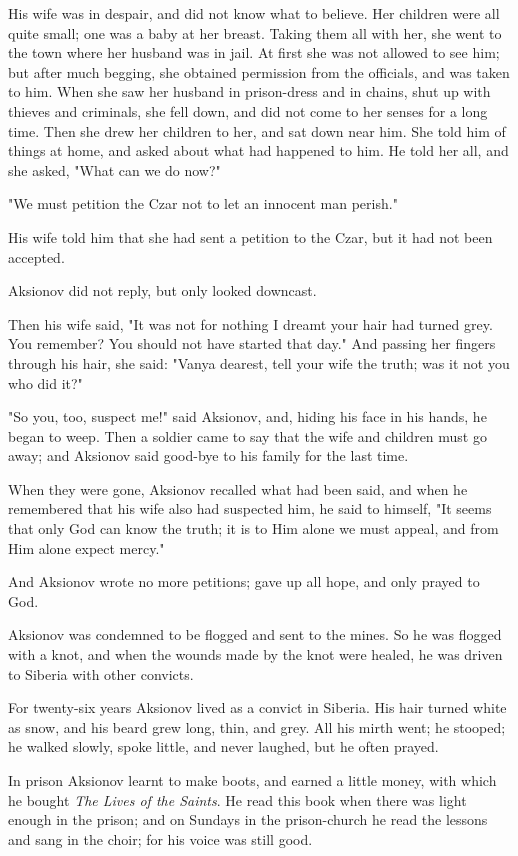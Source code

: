 His wife was in despair, and did not know what to believe. Her
children were all quite small; one was a baby at her breast. Taking
them all with her, she went to the town where her husband was in jail.
At first she was not allowed to see him; but after much begging, she
obtained permission from the officials, and was taken to him. When she
saw her husband in prison-dress and in chains, shut up with thieves
and criminals, she fell down, and did not come to her senses for a
long time. Then she drew her children to her, and sat down near him.
She told him of things at home, and asked about what had happened to
him. He told her all, and she asked, "What can we do now?"

"We must petition the Czar not to let an innocent man perish."

His wife told him that she had sent a petition to the Czar, but it had
not been accepted.

Aksionov did not reply, but only looked downcast.

Then his wife said, "It was not for nothing I dreamt your hair had
turned grey. You remember? You should not have started that day." And
passing her fingers through his hair, she said: "Vanya dearest, tell
your wife the truth; was it not you who did it?"

"So you, too, suspect me!" said Aksionov, and, hiding his face in his
hands, he began to weep. Then a soldier came to say that the wife and
children must go away; and Aksionov said good-bye to his family for
the last time.

When they were gone, Aksionov recalled what had been said, and when he
remembered that his wife also had suspected him, he said to himself,
"It seems that only God can know the truth; it is to Him alone we must
appeal, and from Him alone expect mercy."

And Aksionov wrote no more petitions; gave up all hope, and only
prayed to God.

Aksionov was condemned to be flogged and sent to the mines. So he was
flogged with a knot, and when the wounds made by the knot were healed,
he was driven to Siberia with other convicts.

For twenty-six years Aksionov lived as a convict in Siberia. His hair
turned white as snow, and his beard grew long, thin, and grey. All his
mirth went; he stooped; he walked slowly, spoke little, and never
laughed, but he often prayed.

In prison Aksionov learnt to make boots, and earned a little money,
with which he bought \emph{The Lives of the Saints}. He read this book when
there was light enough in the prison; and on Sundays in the
prison-church he read the lessons and sang in the choir; for his voice
was still good.

